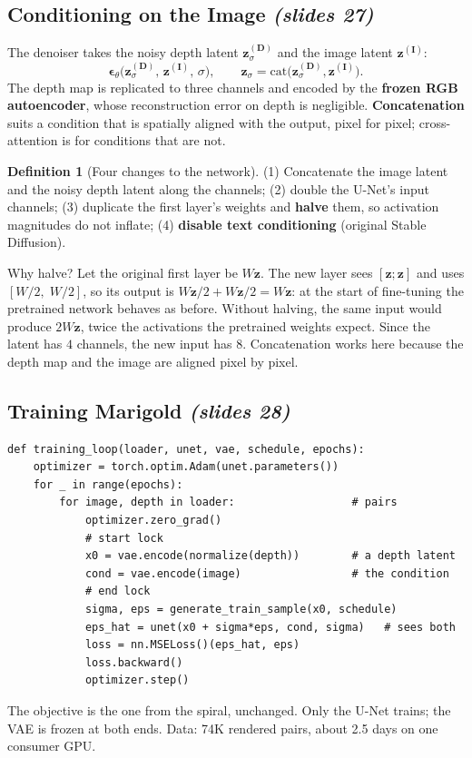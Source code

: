 \documentclass[11pt,a4paper]{article}
\numberwithin{equation}{section}
\newcommand{\slides}[1]{\texorpdfstring{\;\emph{(slides #1)}}{ (slides #1)}}
\newcommand{\bz}{\bm{z}}
\newcommand{\beps}{\bm{\epsilon}}
\theoremstyle{plain}
\theoremstyle{definition}
\newtheorem{definition}[theorem]{Definition}
\begin{document}
\subsection{Conditioning on the Image \slides{27}}
The denoiser takes the noisy depth latent $\bz^{(\bm D)}_\sigma$ and the image latent $\bz^{(\bm I)}$:
\begin{equation}
\beps_\theta\bigl(\bz^{(\bm D)}_\sigma,\,\bz^{(\bm I)},\,\sigma\bigr),\qquad \bz_\sigma=\mathrm{cat}\bigl(\bz^{(\bm D)}_\sigma,\bz^{(\bm I)}\bigr).
\end{equation}
The depth map is replicated to three channels and encoded by the \textbf{frozen RGB autoencoder}, whose reconstruction error on depth is negligible. \textbf{Concatenation} suits a condition that is spatially aligned with the output, pixel for pixel; cross-attention is for conditions that are not.

\begin{definition}[Four changes to the network]
(1) Concatenate the image latent and the noisy depth latent along the channels; (2) double the U-Net's input channels; (3) duplicate the first layer's weights and \textbf{halve} them, so activation magnitudes do not inflate; (4) \textbf{disable text conditioning} (original Stable Diffusion).
\end{definition}

\begin{intuition}
Why halve? Let the original first layer be $W\bz$. The new layer sees $[\bz;\bz]$ and uses $[W/2,\;W/2]$, so its output is $W\bz/2+W\bz/2=W\bz$: at the start of fine-tuning the pretrained network behaves as before. Without halving, the same input would produce $2W\bz$, twice the activations the pretrained weights expect. Since the latent has $4$ channels, the new input has $8$. Concatenation works here because the depth map and the image are aligned pixel by pixel.
\end{intuition}

\subsection{Training Marigold \slides{28}}
\begin{lstlisting}
def training_loop(loader, unet, vae, schedule, epochs):
    optimizer = torch.optim.Adam(unet.parameters())
    for _ in range(epochs):
        for image, depth in loader:                  # pairs
            optimizer.zero_grad()
            # start lock
            x0 = vae.encode(normalize(depth))        # a depth latent
            cond = vae.encode(image)                 # the condition
            # end lock
            sigma, eps = generate_train_sample(x0, schedule)
            eps_hat = unet(x0 + sigma*eps, cond, sigma)   # sees both
            loss = nn.MSELoss()(eps_hat, eps)
            loss.backward()
            optimizer.step()
\end{lstlisting}
The objective is the one from the spiral, unchanged. Only the U-Net trains; the VAE is frozen at both ends. Data: 74K rendered pairs, about 2.5 days on one consumer GPU.
\end{document}
